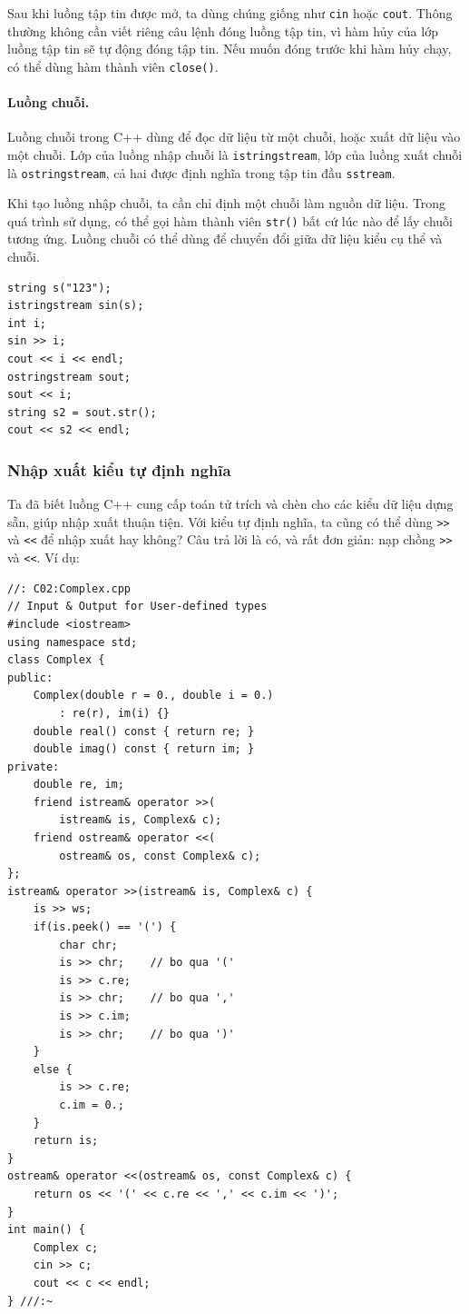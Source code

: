 \documentclass[11pt]{article}
\newcommand{\cpp}{C++}
\begin{document}
Sau khi luồng tập tin được mở, ta dùng chúng giống như \verb|cin| hoặc
\verb|cout|. Thông thường không cần viết riêng câu lệnh đóng luồng tập tin,
vì hàm hủy của lớp luồng tập tin sẽ tự động đóng tập tin. Nếu muốn đóng trước
khi hàm hủy chạy, có thể dùng hàm thành viên \verb|close()|.

\paragraph{Luồng chuỗi.}
Luồng chuỗi trong \cpp{} dùng để đọc dữ liệu từ một chuỗi, hoặc xuất dữ liệu
vào một chuỗi. Lớp của luồng nhập chuỗi là \verb|istringstream|, lớp của
luồng xuất chuỗi là \verb|ostringstream|, cả hai được định nghĩa trong tập tin
đầu \verb|sstream|.

Khi tạo luồng nhập chuỗi, ta cần chỉ định một chuỗi làm nguồn dữ liệu. Trong
quá trình sử dụng, có thể gọi hàm thành viên \verb|str()| bất cứ lúc nào để
lấy chuỗi tương ứng. Luồng chuỗi có thể dùng để chuyển đổi giữa dữ liệu kiểu
cụ thể và chuỗi.

\begin{verbatim}
string s("123");
istringstream sin(s);
int i;
sin >> i;
cout << i << endl;
ostringstream sout;
sout << i;
string s2 = sout.str();
cout << s2 << endl;
\end{verbatim}

\subsubsection*{Nhập xuất kiểu tự định nghĩa}

Ta đã biết luồng \cpp{} cung cấp toán tử trích và chèn cho các kiểu dữ liệu
dựng sẵn, giúp nhập xuất thuận tiện. Với kiểu tự định nghĩa, ta cũng có thể
dùng \verb|>>| và \verb|<<| để nhập xuất hay không? Câu trả lời là có, và rất
đơn giản: nạp chồng \verb|>>| và \verb|<<|. Ví dụ:

\begin{verbatim}
//: C02:Complex.cpp
// Input & Output for User-defined types
#include <iostream>
using namespace std;
class Complex {
public:
    Complex(double r = 0., double i = 0.)
        : re(r), im(i) {}
    double real() const { return re; }
    double imag() const { return im; }
private:
    double re, im;
    friend istream& operator >>(
        istream& is, Complex& c);
    friend ostream& operator <<(
        ostream& os, const Complex& c);
};
istream& operator >>(istream& is, Complex& c) {
    is >> ws;
    if(is.peek() == '(') {
        char chr;
        is >> chr;    // bo qua '('
        is >> c.re;
        is >> chr;    // bo qua ','
        is >> c.im;
        is >> chr;    // bo qua ')'
    }
    else {
        is >> c.re;
        c.im = 0.;
    }
    return is;
}
ostream& operator <<(ostream& os, const Complex& c) {
    return os << '(' << c.re << ',' << c.im << ')';
}
int main() {
    Complex c;
    cin >> c;
    cout << c << endl;
} ///:~
\end{verbatim}
\end{document}
